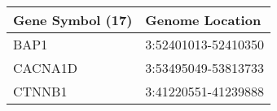 \begin{tabular}{ll}
\toprule
Gene Symbol (17) &     Genome Location \\
\midrule
            BAP1 & 3:52401013-52410350 \\
         CACNA1D & 3:53495049-53813733 \\
          CTNNB1 & 3:41220551-41239888 \\
\bottomrule
\end{tabular}
